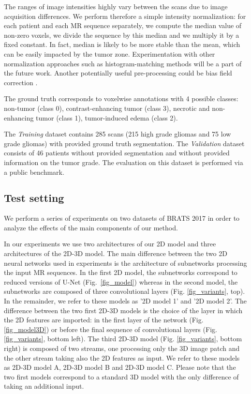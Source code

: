 \documentclass[preprint,12pt]{elsarticle}
\begin{document}
The ranges of image intensities highly vary between the scans due to image acquisition differences. We perform therefore a simple intensity normalization: for each patient and each MR sequence separately, we compute the median value of non-zero voxels, we divide the sequence by this median and we multiply it by a fixed constant. In fact, median is likely to be more stable than the mean, which can be easily impacted by the tumor zone. Experimentation with other normalization approaches such as histogram-matching methods \cite{nyul2000new} will be a part of the future work. Another potentially useful pre-processing could be bias field correction \cite{sled1998nonparametric}.


The ground truth corresponds to voxelwise annotations with 4 possible classes: non-tumor (class 0), contrast-enhancing tumor (class 3), necrotic and non-enhancing tumor (class 1), tumor-induced edema (class 2).

The \textit{Training} dataset contains 285 scans (215 high grade gliomas and 75 low grade gliomas) with provided ground truth segmentation. 
The \textit{Validation} dataset consists of 46 patients without provided segmentation and without provided information on the tumor grade. The evaluation on this dataset is performed via a public benchmark. 


\subsection{Test setting}


We perform a series of experiments on two datasets of BRATS 2017 in order to analyze the effects of the main components of our method. 


In our experiments we use two architectures of our 2D model and three architectures of the 2D-3D model. The main difference between the two 2D neural networks used in experiments is the architecture of subnetworks processing the input MR sequences. In the first 2D model, the subnetworks correspond to reduced versions of U-Net (Fig.~\ref{fig_model}) whereas in the second model, the subnetworks are composed of three convolutional layers (Fig. \ref{fig_variants}, top). In the remainder, we refer to these models as '2D model 1' and '2D model 2'. The difference between the two first 2D-3D models is the choice of the layer in which the 2D features are imported: in the first layer of the network (Fig. \ref{fig_model3D}) or before the final sequence of convolutional layers (Fig. \ref{fig_variants}, bottom left). The third 2D-3D model (Fig. \ref{fig_variants}, bottom right) is composed of two streams, one processing only the 3D image patch and the other stream taking also the 2D features as input. We refer to these models as 2D-3D model A, 2D-3D model B and 2D-3D model C. Please note that the two first models correspond to a standard 3D model with the only difference of taking an additional input. 
\end{document}
